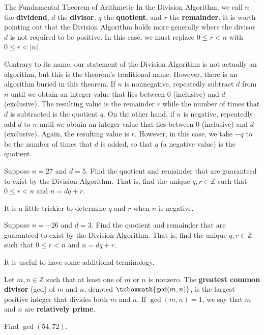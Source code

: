 \begin{section}{The Fundamental Theorem of Arithmetic}
In the Division Algorithm, we call $n$ the \textbf{dividend}, $d$ the \textbf{divisor}, $q$ the \textbf{quotient}, and $r$ the \textbf{remainder}.  It is worth pointing out that the Division Algorithm holds more generally where the divisor $d$ is not required to be positive. In this case, we must replace $0\leq r<n$ with $0\leq r<|n|$. 

Contrary to its name, our statement of the Division Algorithm is not actually an algorithm, but this is the theorem's traditional name. However, there is an algorithm buried in this theorem. If $n$ is nonnegative, repeatedly subtract $d$ from $n$ until we obtain an integer value that lies between 0 (inclusive) and $d$ (exclusive). The resulting value is the remainder $r$ while the number of times that $d$ is subtracted is the quotient $q$. On the other hand, if $n$ is negative, repeatedly add $d$ to $n$ until we obtain an integer value that lies between 0 (inclusive) and $d$ (exclusive). Again, the resulting value is $r$. However, in this case, we take $-q$ to be the number of times that $d$ is added, so that $q$ (a negative value) is the quotient.

\begin{problem}
Suppose $n=27$ and $d=5$. Find the quotient and remainder that are guaranteed to exist by the Division Algorithm.  That is, find the unique $q,r\in\mathbb{Z}$ such that $0\leq r<n$ and $n=dq+r$.
\end{problem}

It is a little trickier to determine $q$ and $r$ when $n$ is negative.

\begin{problem}
Suppose $n=-26$ and $d=3$. Find the quotient and remainder that are guaranteed to exist by the Division Algorithm.  That is, find the unique $q,r\in\mathbb{Z}$ such that $0\leq r<n$ and $n=dq+r$.
\end{problem}

It is useful to have some additional terminology.

\begin{definition}
Let $m,n\in\mathbb{Z}$ such that at least one of $m$ or $n$ is nonzero.  The \textbf{greatest common divisor} (gcd) of $m$ and $n$, denoted $\tcboxmath{\gcd(m,n)}$, is the largest positive integer that divides both $m$ and $n$. If $\gcd(m,n)=1$, we say that $m$ and $n$ are \textbf{relatively prime}.
\end{definition}

\begin{problem}
Find $\gcd(54,72)$.
\end{problem}


\end{section}
